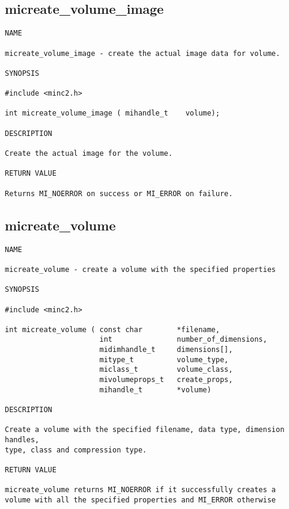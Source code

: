 \documentclass{article}
\begin{document}
\subsection{micreate\_volume\_image}
\begin{verbatim}
NAME

micreate_volume_image - create the actual image data for volume.

SYNOPSIS

#include <minc2.h>

int micreate_volume_image ( mihandle_t    volume);

DESCRIPTION

Create the actual image for the volume.

RETURN VALUE

Returns MI_NOERROR on success or MI_ERROR on failure.
\end{verbatim}

\subsection{micreate\_volume}
\begin{verbatim}
NAME

micreate_volume - create a volume with the specified properties

SYNOPSIS

#include <minc2.h>

int micreate_volume ( const char        *filename,
                      int               number_of_dimensions,
                      midimhandle_t     dimensions[],
                      mitype_t          volume_type,
                      miclass_t         volume_class,
                      mivolumeprops_t   create_props,
                      mihandle_t        *volume)

DESCRIPTION

Create a volume with the specified filename, data type, dimension handles,
type, class and compression type.

RETURN VALUE

micreate_volume returns MI_NOERROR if it successfully creates a
volume with all the specified properties and MI_ERROR otherwise
\end{verbatim}
\end{document}
